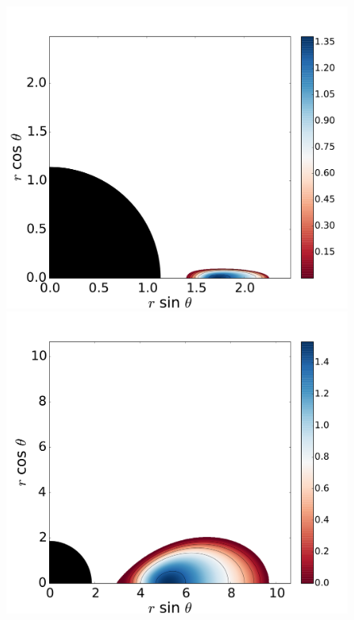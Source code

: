 \documentclass[referee]{aa}
\begin{document}
\begin{figure}
\includegraphics[scale=0.14]{figures/fig2_3_3.pdf}
\\
\includegraphics[scale=0.14]{figures/fig2_4_1.pdf}
\hspace{-0.3cm}

\end{figure}
\end{document}
